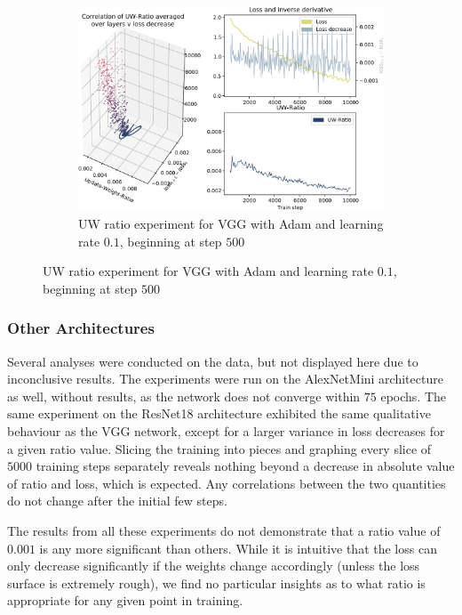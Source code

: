 \begin{figure}
    \begin{subfigure}{\textwidth}
        \centering
        \includegraphics[width=\linewidth]{gfx/diagrams/experiments/ratio_loss_correlation/vgg_adam_01_500_10000.pdf}
        \caption{UW ratio experiment for VGG with Adam and learning rate $0.1$,
        beginning at step $500$}
        \label{fig:ratio_loss_corr_vgg_adam_01_500}
    \end{subfigure}
\end{figure}

\subsubsection*{Other Architectures}

Several analyses were conducted on the data, but not displayed here due to
inconclusive results.
The experiments were run on the AlexNetMini architecture as well, without
results, as the network does not converge within $75$ epochs.
The same experiment on the ResNet18 architecture exhibited the same qualitative
behaviour as the VGG network, except for a larger variance in loss decreases for
a given ratio value. Slicing the training into pieces and graphing every slice
of $5000$ training steps separately reveals nothing beyond a decrease in
absolute value of ratio and loss, which is expected. Any correlations between
the two quantities do not change after the initial few steps.

The results from all these experiments do not demonstrate that a ratio value
of $0.001$ is any more significant than others. While it is intuitive that the loss
can only decrease significantly if the weights change accordingly (unless the
loss surface is extremely rough), we find no particular insights as to what
ratio is appropriate for any given point in training.

